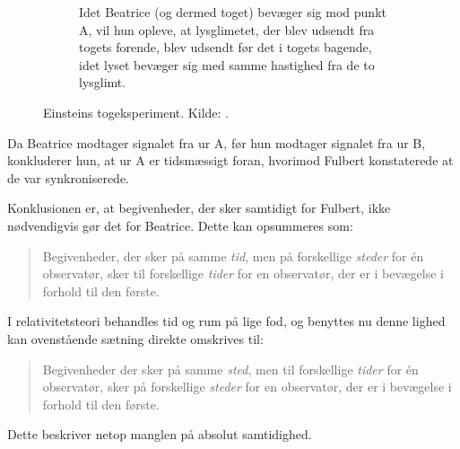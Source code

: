 \begin{figure}[t]
\begin{subfigure}[t]{.31\textwidth}
        \caption{Idet Beatrice (og dermed toget) bevæger sig mod punkt A, vil hun opleve, at lysglimetet, der blev udsendt fra togets forende, blev udsendt før det i togets bagende, idet lyset bevæger sig med samme hastighed fra de to lysglimt.}
        \label{fig:EinsteinsTrainExperiment3}
    \end{subfigure}
    \caption{Einsteins togeksperiment. Kilde: \cite{uggerhojSpecielRelativitetsteori2016}.}
    \label{fig:EinsteinsTrainExperiment}
\end{figure}
%
Da Beatrice modtager signalet fra ur A, før hun modtager signalet fra ur B,
konkluderer hun, at ur A er tidsmæssigt foran, hvorimod Fulbert konstaterede at de var synkroniserede.

Konklusionen er, at begivenheder, der sker samtidigt for Fulbert, ikke nødvendigvis gør det for Beatrice. Dette kan opsummeres som:
%
\begin{quote}
	Begivenheder, der sker på samme \emph{tid}, men på forskellige \emph{steder} for én observatør, sker til forskellige \emph{tider} for en observatør, der er i bevægelse i forhold til den første.
\end{quote}
%
I relativitetsteori behandles tid og rum på lige fod, og benyttes nu denne lighed kan ovenstående sætning direkte omskrives til:
%
\begin{quote}
	Begivenheder der sker på samme \emph{sted}, men til forskellige \emph{tider} for én observatør, sker på forskellige \emph{steder} for en observatør, der er i bevægelse i forhold til den første.
\end{quote}
%
Dette beskriver netop manglen på absolut samtidighed.